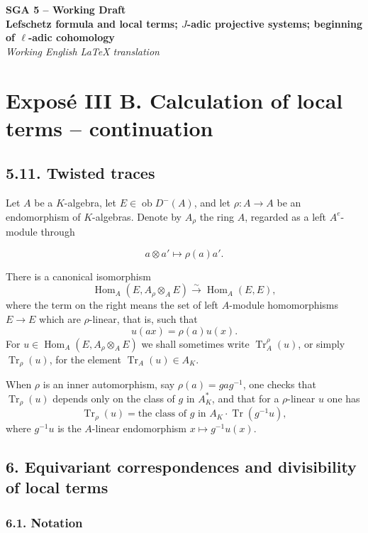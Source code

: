\documentclass[12pt]{article}
\newcommand{\Hom}{\operatorname{Hom}}
\newcommand{\Tr}{\operatorname{Tr}}
\newcommand{\ob}{\operatorname{ob}}
\begin{document}
\begin{center}
{\Large \textbf{SGA 5 -- Working Draft}}\\[0.35em]
{\large \textbf{Lefschetz formula and local terms; $J$-adic projective systems; beginning of $\ell$-adic cohomology}}\\[0.35em]
\emph{Working English LaTeX translation}\
\end{center}

\bigskip

\section*{Exposé III B. Calculation of local terms -- continuation}

\subsection*{5.11. Twisted traces}

Let $A$ be a $K$-algebra, let $E\in\ob D^-(A)$, and let
$\rho:A\to A$ be an endomorphism of $K$-algebras. Denote by
$A_\rho$ the ring $A$, regarded as a left $A^e$-module through

\[
   a \otimes a' \longmapsto \rho(a)a'.
\]

There is a canonical isomorphism
\[
   \Hom_A(E,A_\rho\otimes_A E)\xrightarrow{\sim}\Hom_A(E,E),
\]
where the term on the right means the set of left $A$-module homomorphisms
$E\to E$ which are $\rho$-linear, that is, such that
\[
        u(ax)=\rho(a)u(x).
\]
For $u\in\Hom_A(E,A_\rho\otimes_A E)$ we shall sometimes write
$\Tr_A^\rho(u)$, or simply $\Tr_\rho(u)$, for the element
$\Tr_A(u)\in A_K$.

When $\rho$ is an inner automorphism, say $\rho(a)=gag^{-1}$, one checks that
$\Tr_\rho(u)$ depends only on the class of $g$ in $A_K^*$, and that for a
$\rho$-linear $u$ one has
\begin{equation}\tag{5.13.1}
   \Tr_\rho(u)=\text{the class of }g\text{ in }A_K\cdot \Tr(g^{-1}u),
\end{equation}
where $g^{-1}u$ is the $A$-linear endomorphism $x\mapsto g^{-1}u(x)$.

\subsection*{6. Equivariant correspondences and divisibility of local terms}

\subsubsection*{6.1. Notation}
\end{document}
